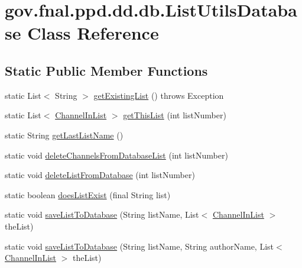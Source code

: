 \hypertarget{classgov_1_1fnal_1_1ppd_1_1dd_1_1db_1_1ListUtilsDatabase}{\section{gov.\-fnal.\-ppd.\-dd.\-db.\-List\-Utils\-Database Class Reference}
\label{classgov_1_1fnal_1_1ppd_1_1dd_1_1db_1_1ListUtilsDatabase}
}
\subsection*{Static Public Member Functions}
\begin{DoxyCompactItemize}
\item 
static List$<$ String $>$ \hyperlink{classgov_1_1fnal_1_1ppd_1_1dd_1_1db_1_1ListUtilsDatabase_afb004a01d8a3d02efaaa50ed734b0564}{get\-Existing\-List} ()  throws Exception 
\item 
static List$<$ \hyperlink{classgov_1_1fnal_1_1ppd_1_1dd_1_1channel_1_1ChannelInList}{Channel\-In\-List} $>$ \hyperlink{classgov_1_1fnal_1_1ppd_1_1dd_1_1db_1_1ListUtilsDatabase_aee47d0141e92fe89e80a36b5a6a5cd04}{get\-This\-List} (int list\-Number)
\item 
static String \hyperlink{classgov_1_1fnal_1_1ppd_1_1dd_1_1db_1_1ListUtilsDatabase_a328b15f961d8325f5564b91d2bba7ead}{get\-Last\-List\-Name} ()
\item 
static void \hyperlink{classgov_1_1fnal_1_1ppd_1_1dd_1_1db_1_1ListUtilsDatabase_abaed6c93ac5b31e28158b84ec1d80986}{delete\-Channels\-From\-Database\-List} (int list\-Number)
\item 
static void \hyperlink{classgov_1_1fnal_1_1ppd_1_1dd_1_1db_1_1ListUtilsDatabase_a514d14190bbbb559a123956f472db983}{delete\-List\-From\-Database} (int list\-Number)
\item 
static boolean \hyperlink{classgov_1_1fnal_1_1ppd_1_1dd_1_1db_1_1ListUtilsDatabase_a6a89a828ee53dccda4455a61cf7ac94c}{does\-List\-Exist} (final String list)
\item 
static void \hyperlink{classgov_1_1fnal_1_1ppd_1_1dd_1_1db_1_1ListUtilsDatabase_a118a13c8c7f09f5625b7734089572b3f}{save\-List\-To\-Database} (String list\-Name, List$<$ \hyperlink{classgov_1_1fnal_1_1ppd_1_1dd_1_1channel_1_1ChannelInList}{Channel\-In\-List} $>$ the\-List)
\item 
static void \hyperlink{classgov_1_1fnal_1_1ppd_1_1dd_1_1db_1_1ListUtilsDatabase_a50bec4bb6b4a903951b19495c8390831}{save\-List\-To\-Database} (String list\-Name, String author\-Name, List$<$ \hyperlink{classgov_1_1fnal_1_1ppd_1_1dd_1_1channel_1_1ChannelInList}{Channel\-In\-List} $>$ the\-List)

\end{DoxyCompactItemize}

